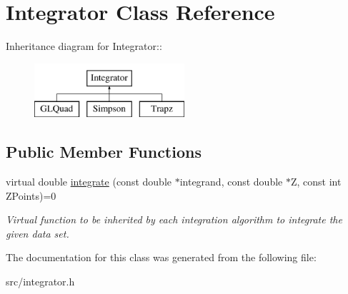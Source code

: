 \hypertarget{classIntegrator}{
\section{Integrator Class Reference}
\label{da/d05/classIntegrator}
}
Inheritance diagram for Integrator::\begin{figure}[H]
\begin{center}
\leavevmode
\includegraphics[height=2cm]{da/d05/classIntegrator}
\end{center}
\end{figure}
\subsection*{Public Member Functions}
\begin{DoxyCompactItemize}
\item 
\hypertarget{classIntegrator_a89fbef2f7923ce4e2c979b2ff1d1f4ac}{
virtual double \hyperlink{classIntegrator_a89fbef2f7923ce4e2c979b2ff1d1f4ac}{integrate} (const double $\ast$integrand, const double $\ast$Z, const int ZPoints)=0}
\label{da/d05/classIntegrator_a89fbef2f7923ce4e2c979b2ff1d1f4ac}

\begin{DoxyCompactList}\small\item\em Virtual function to be inherited by each integration algorithm to integrate the given data set. \item\end{DoxyCompactList}\end{DoxyCompactItemize}


The documentation for this class was generated from the following file:\begin{DoxyCompactItemize}
\item 
src/integrator.h\end{DoxyCompactItemize}
